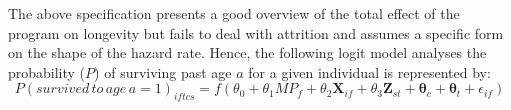The above specification presents a good overview of the total effect of the program on longevity but fails to deal with attrition and assumes a specific form on the shape of the hazard rate. Hence, the following logit model analyses the probability ($P$) of surviving past age $a$ for a given individual is represented by:
$$
P(survived\,to\,age\,a=1)_{iftcs} = f(\theta_0 + \theta_1MP_f + \theta_2\mathbf{X}_{if} + \theta_3\mathbf{Z}_{st} + \mathbf{\theta}_c + \mathbf{\theta}_t + \epsilon_{if})
$$